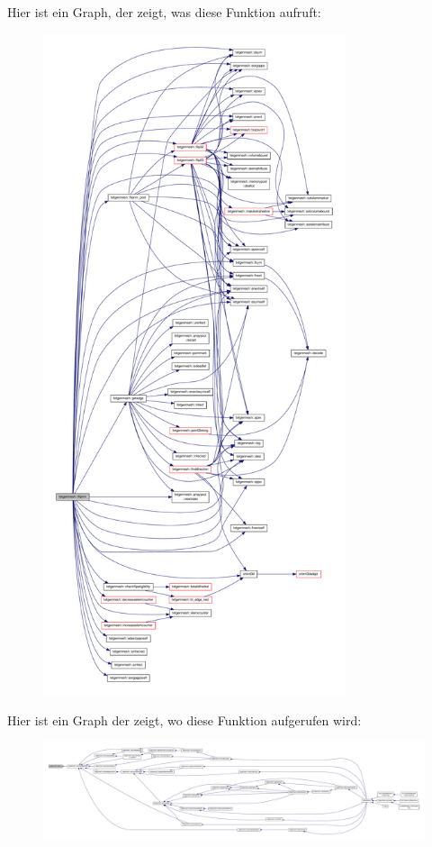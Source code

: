 Hier ist ein Graph, der zeigt, was diese Funktion aufruft\-:\nopagebreak
\begin{figure}[H]
\begin{center}
\leavevmode
\includegraphics[height=550pt]{classtetgenmesh_aab593bf52c98bf0315b39afc65c06312_cgraph}
\end{center}
\end{figure}




Hier ist ein Graph der zeigt, wo diese Funktion aufgerufen wird\-:\nopagebreak
\begin{figure}[H]
\begin{center}
\leavevmode
\includegraphics[width=350pt]{classtetgenmesh_aab593bf52c98bf0315b39afc65c06312_icgraph}
\end{center}
\end{figure}



